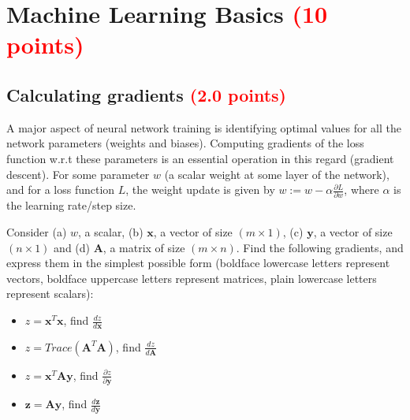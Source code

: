 \documentclass[answers]{exam}
\newcommand{\mypoints}[1]{\textcolor{red}{(#1 points)}}
\begin{document}
\newpage


\newpage
\section{Machine Learning Basics \mypoints{10}}
\subsection{Calculating gradients \mypoints{2.0}}
A major aspect of neural network training is identifying optimal values for all the network parameters (weights and biases). Computing gradients of the loss function w.r.t these parameters is an essential operation in this regard (gradient descent). For some parameter $w$ (a scalar weight at some layer of the network), and for a loss function $L$, the weight update is given by $w:=w-\alpha\frac{\partial L}{\partial w}$, where $\alpha$ is the learning rate/step size.

Consider (a) $w$, a scalar, (b) $\mathbf{x}$, a vector of size $(m\times 1)$, (c) $\mathbf{y}$, a vector of size $(n\times 1)$ and (d) $\mathbf{A}$, a matrix of size $(m\times n)$. Find the following gradients, and express them in the simplest possible form (boldface lowercase letters represent vectors, boldface uppercase letters represent matrices, plain lowercase letters represent scalars):
\begin{itemize}
    \item $z=\mathbf{x}^{T}\mathbf{x}$, find $\frac{dz}{d\mathbf{x}}$
    \item $z=Trace(\mathbf{A}^{T}\mathbf{A})$, find $\frac{dz}{d\mathbf{A}}$
    \item $z=\mathbf{x}^{T}\mathbf{A}\mathbf{y}$, find $\frac{\partial z}{\partial\mathbf{y}}$
    \item $\mathbf{z}=\mathbf{A}\mathbf{y}$, find $\frac{d\mathbf{z}}{d\mathbf{y}}$
\end{itemize}
\end{document}
